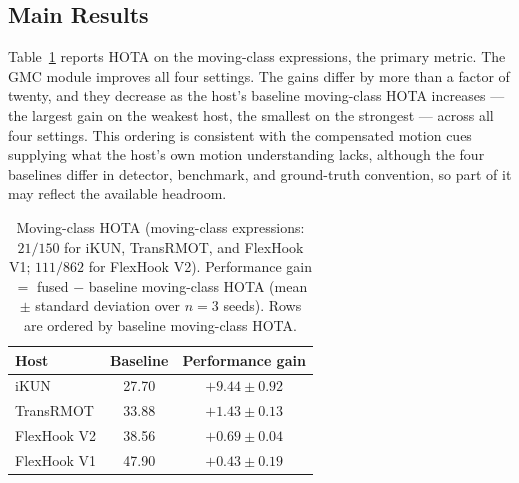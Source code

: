 \documentclass{article}
\begin{document}
\subsection{Main Results}
\label{sec:main}
Table~\ref{tab:deficit} reports HOTA on the moving-class expressions, the primary metric. The GMC module improves all four settings. The gains differ by more than a factor of twenty, and they decrease as the host's baseline moving-class HOTA increases --- the largest gain on the weakest host, the smallest on the strongest --- across all four settings. This ordering is consistent with the compensated motion cues supplying what the host's own motion understanding lacks, although the four baselines differ in detector, benchmark, and ground-truth convention, so part of it may reflect the available headroom.

\begin{table}[t]
  \centering
  \caption{Moving-class HOTA (moving-class expressions: $21/150$ for iKUN, TransRMOT, and FlexHook V1; $111/862$ for FlexHook V2). Performance gain $=$ fused $-$ baseline moving-class HOTA (mean $\pm$ standard deviation over $n{=}3$ seeds). Rows are ordered by baseline moving-class HOTA.}
  \label{tab:deficit}
  \footnotesize
  \begin{tabular*}{\linewidth}{@{\extracolsep{\fill}}lcc}
    \hline
    Host        & Baseline & Performance gain \\
    \hline
    iKUN        & 27.70    & $+9.44\pm0.92$   \\
    TransRMOT   & 33.88    & $+1.43\pm0.13$   \\
    FlexHook V2 & 38.56    & $+0.69\pm0.04$   \\
    FlexHook V1 & 47.90    & $+0.43\pm0.19$   \\
    \hline
  \end{tabular*}
\end{table}
\end{document}
